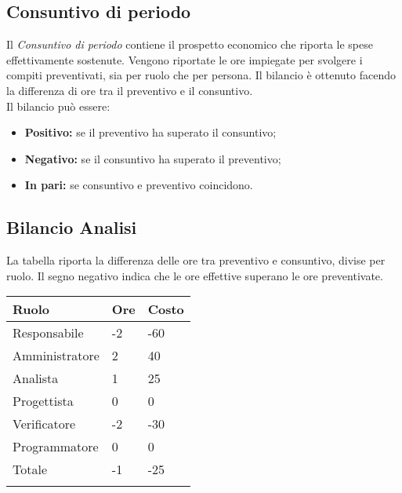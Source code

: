 \begin{flushleft}
    \chapter{Consuntivo di periodo}
    \label{consuntivoperiodo}
    Il \textit{Consuntivo di periodo} contiene il prospetto economico che riporta le spese effettivamente sostenute. Vengono riportate le ore impiegate per svolgere i compiti preventivati, sia per
    ruolo che per persona. Il bilancio è ottenuto facendo la differenza di ore tra il preventivo e il consuntivo.\\
    Il bilancio può essere:
    \begin{itemize}
        \item \textbf{Positivo:} se il preventivo ha superato il consuntivo;
        \item \textbf{Negativo:} se il consuntivo ha superato il preventivo;
        \item \textbf{In pari:} se consuntivo e preventivo coincidono.
    \end{itemize}

    \section{Bilancio Analisi}
    La tabella riporta la differenza delle ore tra preventivo e consuntivo, divise per ruolo. Il segno negativo indica che le ore effettive superano le ore preventivate.  
      
\newpage
        \begin{tabularx}{\textwidth}{|l|l|l|}
        \hline
        Ruolo          & Ore & Costo \\ \hline
        Responsabile   & -2  & -60   \\ \hline
        Amministratore & 2   & 40    \\ \hline
        Analista       & 1   & 25    \\ \hline
        Progettista    & 0   & 0     \\ \hline
        Verificatore   & -2  & -30   \\ \hline
        Programmatore  & 0   & 0     \\ \hline
        Totale         & -1   & -25   \\ \hline
        \caption{Differenza delle ore tra preventivo e consultivo divise per ruolo}    
    \end{tabularx}




\end{flushleft}

